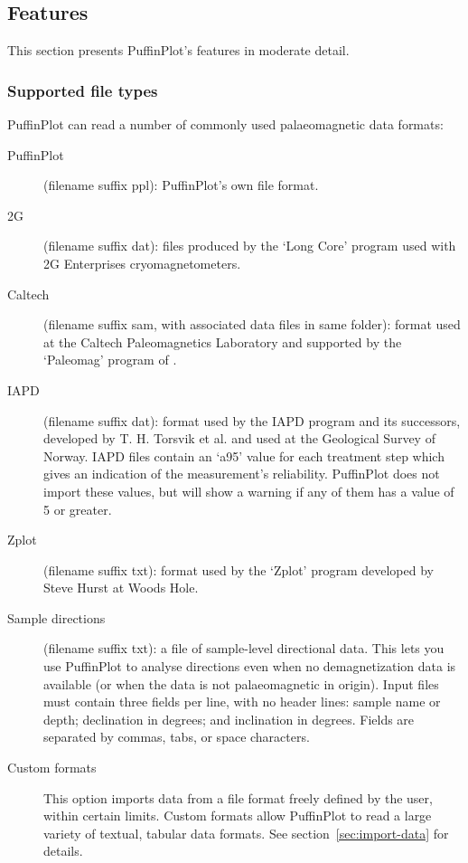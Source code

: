\documentclass[a4paper,british]{article}
\newcommand{\ppcmd}[1]{\textsf{#1}} %
\newcommand{\caps}[1]{\MakeTextUppercase{#1}} %
\begin{document}
\subsection{Features}

This section presents PuffinPlot's features in moderate detail.

\subsubsection{\label{sec:file-types}Supported file types}

PuffinPlot can read a number of commonly used palaeomagnetic data
formats:

\begin{description}

\item[PuffinPlot] (filename suffix \ppcmd{ppl}): PuffinPlot's own file
  format.

\item[2G] (filename suffix \ppcmd{dat}): files produced by the `Long
  Core' program used with 2G Enterprises cryomagnetometers.

\item[Caltech] (filename suffix \ppcmd{sam}, with associated data files
  in same folder): format used at the Caltech Paleomagnetics Laboratory
  and supported by the `Paleomag' program of \cite{jones2002paleomag}.

\item[IAPD] (filename suffix \ppcmd{dat}): format used by the
  \caps{iapd} program and its successors, developed by T. H. Torsvik et
  al. and used at the Geological Survey of Norway. IAPD files contain an
  `a95' value for each treatment step which gives an indication of the
  measurement's reliability. PuffinPlot does not import these values,
  but will show a warning if any of them has a value of 5 or greater.

\item[Zplot] (filename suffix \ppcmd{txt}): format used by the 
  `Zplot' program developed by Steve Hurst at Woods Hole.

\item[Sample directions] (filename suffix \ppcmd{txt}): a file of
  sample-level directional data. This lets you use PuffinPlot to analyse
  directions even when no demagnetization data is available (or when the
  data is not palaeomagnetic in origin). Input files must contain three
  fields per line, with no header lines: sample name or depth;
  declination in degrees; and inclination in degrees. Fields are
  separated by commas, tabs, or space characters.

\item[Custom formats] This option imports data from a file format freely
  defined by the user, within certain limits. Custom formats allow
  PuffinPlot to read a large variety of textual, tabular data formats.
  See section~\ref{sec:import-data} for details.

\end{description}
\end{document}
